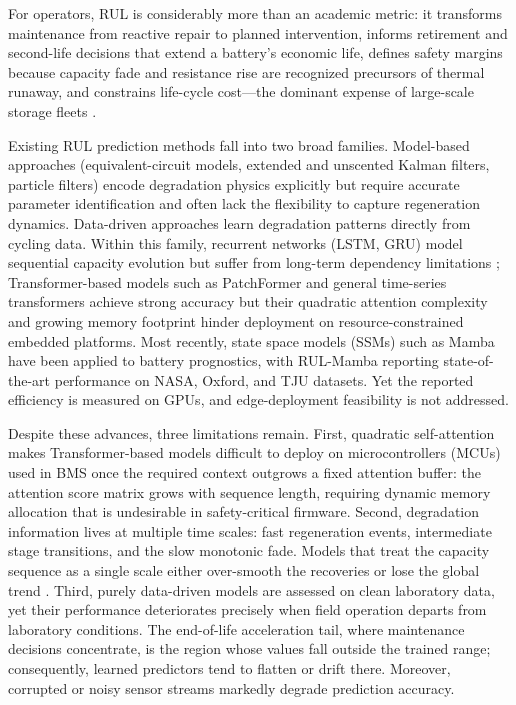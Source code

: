 For operators, RUL is considerably more than an academic metric: 
it transforms maintenance from reactive repair to planned intervention, 
informs retirement and second-life decisions that extend a battery’s economic life, 
defines safety margins because capacity fade and resistance rise are recognized precursors of thermal runaway, 
and constrains life-cycle cost---the dominant expense of large-scale storage fleets
\cite{ref_yang_review,ref_qu_bess}.

Existing RUL prediction methods fall into two broad families.
Model-based approaches (equivalent-circuit models, extended and unscented
Kalman filters, particle filters) encode degradation physics explicitly
\cite{ref_ekf_yan,ref_pf_echem,
ref_pf_rbf,ref_pf_lui} but require accurate parameter identification
and often lack the flexibility to capture regeneration dynamics.
Data-driven approaches learn degradation patterns directly from
cycling data. Within this family, recurrent networks (LSTM, GRU)
\cite{ref_lstm_transformer,ref_lstm_rul_zhang} model
sequential capacity evolution but suffer from long-term dependency
limitations \cite{ref_rulmamba}; Transformer-based models
\cite{ref_vaswani} such as PatchFormer \cite{ref_patchformer}
and general time-series transformers \cite{ref_autoformer}
\cite{ref_fedformer} achieve strong accuracy but their quadratic
attention complexity and growing memory footprint hinder deployment
on resource-constrained embedded platforms. Most recently, state
space models (SSMs) such as Mamba \cite{ref_mamba} have been applied
to battery prognostics, with RUL-Mamba \cite{ref_rulmamba} reporting
state-of-the-art performance on NASA, Oxford, and TJU datasets. Yet
the reported efficiency is measured on GPUs, and edge-deployment
feasibility is not addressed.

Despite these advances, three limitations remain. First, quadratic
self-attention makes Transformer-based models difficult to deploy on
microcontrollers (MCUs) used in BMS once the required context
outgrows a fixed attention buffer: the attention score matrix grows
with sequence length, requiring dynamic memory allocation that is
undesirable in safety-critical firmware. Second, degradation
information lives at multiple time scales: fast regeneration
events, intermediate stage transitions, and the slow monotonic
fade. Models that treat the capacity sequence as a single scale
either over-smooth the recoveries or lose the global trend
\cite{ref_omnitie}. Third, purely data-driven models are assessed on clean laboratory data, 
yet their performance deteriorates precisely when field operation departs from laboratory conditions. 
The end-of-life acceleration tail, where maintenance decisions concentrate, 
is the region whose values fall outside the trained range; consequently, 
learned predictors tend to flatten or drift there. Moreover, 
corrupted or noisy sensor streams markedly degrade prediction accuracy.

